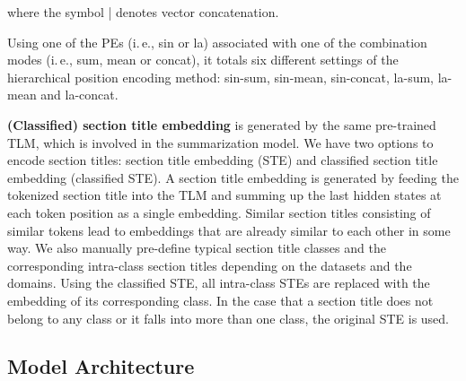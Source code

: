 \documentclass[11pt]{article}
\begin{document}
where the symbol | denotes vector concatenation.

Using one of the PEs (i.\,e., sin or la) associated with one of the combination modes (i.\,e., sum, mean or concat), it totals six different settings of the hierarchical position encoding method: sin-sum, sin-mean, sin-concat, la-sum, la-mean and la-concat. 


\textbf{(Classified) section title embedding} is generated by the same pre-trained TLM, which is involved in the summarization model. We have two options to encode section titles: section title embedding (STE) and classified section title embedding (classified STE). 
A section title embedding is generated by feeding the tokenized section title into the TLM and summing up the last hidden states at each token position as a single embedding. Similar section titles consisting of similar tokens lead to embeddings that are already similar to each other in some way. We also manually pre-define typical section title classes and the corresponding intra-class section titles depending on the datasets and the domains. Using the classified STE, all intra-class STEs are replaced with the embedding of its corresponding class. In the case that a section title does not belong to any class or it falls into more than one class, the original STE is used.  


 
\subsection{Model Architecture}
\label{subsec:Model architecture}
\end{document}
